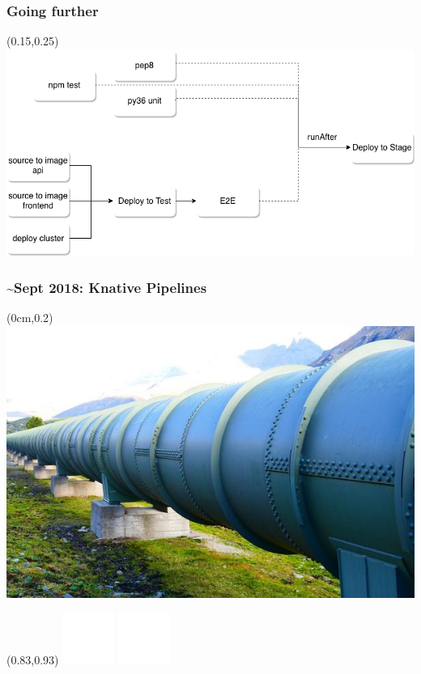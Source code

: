 \documentclass[aspectratio=169,11pt,hyperref={colorlinks=true}]{beamer}
\begin{document}
\begin{lblackrwhiteframe}
\begin{lblackrwhiteframe}
\begin{tblackbgrayframe}
  \frametitle{Going further}
  \begin{textblock*}{0.75\paperwidth}(0.15\paperwidth,0.25\paperheight)
    \includegraphics[width=0.75\paperwidth]{img/test-pipeline.png}
  \end{textblock*}
\end{tblackbgrayframe}

\begin{blackframe}
  \frametitle{\textasciitilde Sept 2018: Knative Pipelines}
  \begin{textblock*}{\paperwidth}(0cm,0.2\paperheight)
    \includegraphics[width=\paperwidth]{img/pipeline_cc0.jpg}
  \end{textblock*}
  \begin{textblock*}{0.2\paperwidth}(0.83\paperwidth,0.93\paperheight)
    \includegraphics[width=0.03\paperwidth]{img/cc.png}
    \includegraphics[width=0.03\paperwidth]{img/zero.png}
  \end{textblock*}
\end{blackframe}


\end{lblackrwhiteframe}
\end{lblackrwhiteframe}
\end{document}

